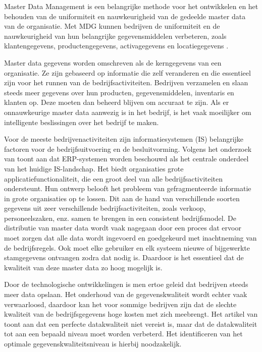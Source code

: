 Master Data Management is een belangrijke methode voor het ontwikkelen en het behouden van de uniformiteit en nauwkeurigheid van de gedeelde master data van de organisatie. Met MDG kunnen bedrijven de uniformiteit en de nauwkeurigheid van hun belangrijke gegevensmiddelen verbeteren, zoals klantengegevens, productengegevens, activagegevens en locatiegegevens \autocite{Foote2023}.

Master data gegevens worden omschreven als de kerngegevens van een organisatie. Ze zijn gebaseerd op informatie die zelf veranderen en die essentieel zijn voor het runnen van de bedrijfsactiviteiten. Bedrijven verzamelen en slaan steeds meer gegevens over hun producten, gegevensmiddelen, inventaris en klanten op. Deze moeten dan beheerd blijven om accuraat te zijn. Als er onnauwkeurige master data aanwezig is in het bedrijf, is het vaak moeilijker om intelligente beslissingen over het bedrijf te maken. 

Voor de meeste bedrijvenactiviteiten zijn informatiesystemen (IS) belangrijke factoren voor de bedrijfsuitvoering en de besluitvorming. Volgens het onderzoek van \textcite{Knolmayer2006} toont aan dat ERP-systemen worden beschouwd als het centrale onderdeel van het huidige IS-landschap. Het biedt organisaties grote applicatiefunctionaliteit, die een groot deel van alle bedrijfsactiviteiten ondersteunt. Hun ontwerp belooft het probleem van gefragmenteerde informatie in grote organisaties op te lossen. Dit aan de hand van verschillende soorten gegevens uit zeer verschillende bedrijfsactiviteiten, zoals verkoop, personeelszaken, enz. samen te brengen in een consistent bedrijfsmodel. De distributie van master data wordt vaak nagegaan door een proces dat ervoor moet zorgen dat alle data wordt ingevoerd en goedgekeurd met inachtneming van de bedrijfsregels. Ook moet elke gebruiker en elk systeem nieuwe of bijgewerkte stamgegevens ontvangen zodra dat nodig is. Daardoor is het essentieel dat de kwaliteit van deze master data zo hoog mogelijk is. 

Door de technologische ontwikkelingen is men ertoe geleid dat bedrijven steeds meer data opslaan. Het onderhoud van de gegevenskwaliteit wordt echter vaak verwaarloosd, daardoor kan het voor sommige bedrijven zijn dat de slechte kwaliteit van de bedrijfsgegevens hoge kosten met zich meebrengt. Het artikel van \textcite{Haug2011} toont aan dat een perfecte datakwaliteit niet vereist is, maar dat de datakwaliteit tot aan een bepaald niveau moet worden verbeterd. Het identificeren van het optimale gegevenskwaliteitsniveau is hierbij noodzakelijk.

